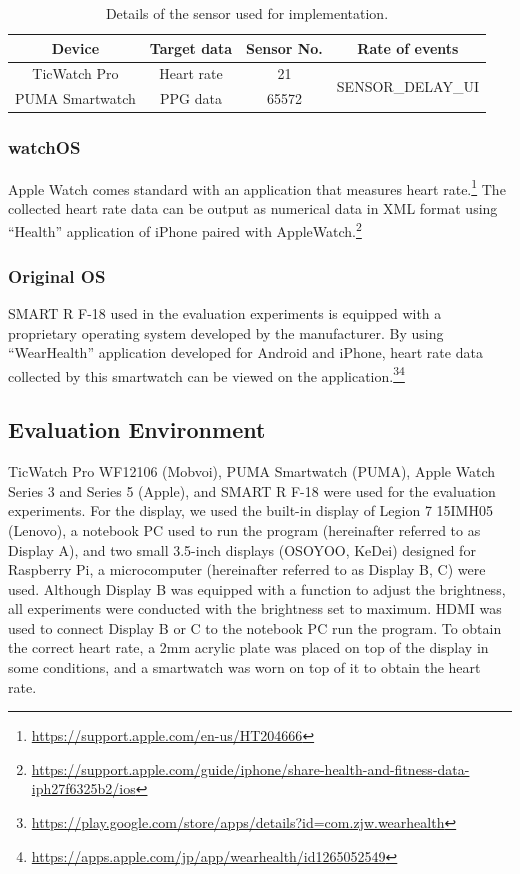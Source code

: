 \documentclass[sigchi,authordraft]{acmart}
\begin{document}
\begin{table}[!t]
  \centering
  \caption{Details of the sensor used for implementation.}
  \begin{tabular}{c|c|c|c} \hline\hline
    Device & Target data & Sensor No. & Rate of events \\ \hline
    TicWatch Pro & Heart rate & 21 & \multirow{2}{*}{SENSOR\_DELAY\_UI} \\
    PUMA Smartwatch & PPG data & 65572 & \\ \hline
  \end{tabular}
  \label{tab:sensor_param}
\end{table}


\subsubsection{watchOS}
\label{subsec:applewatch}
Apple Watch comes standard with an application that measures heart rate.\footnote{\url{https://support.apple.com/en-us/HT204666}} The collected heart rate data can be output as numerical data in XML format using ``Health'' application of iPhone paired with AppleWatch.\footnote{\url{https://support.apple.com/guide/iphone/share-health-and-fitness-data-iph27f6325b2/ios}}


\subsubsection{Original OS}
\label{subsec:original}
SMART R F-18 used in the evaluation experiments is equipped with a proprietary operating system developed by the manufacturer. By using ``WearHealth'' application developed for Android and iPhone, heart rate data collected by this smartwatch can be viewed on the application.\footnote{\url{https://play.google.com/store/apps/details?id=com.zjw.wearhealth}}\footnote{\url{https://apps.apple.com/jp/app/wearhealth/id1265052549}}



\subsection{Evaluation Environment}
TicWatch Pro WF12106 (Mobvoi), PUMA Smartwatch (PUMA), Apple Watch Series 3 and Series 5 (Apple), and SMART R F-18 were used for the evaluation experiments. For the display, we used the built-in display of Legion 7 15IMH05 (Lenovo), a notebook PC used to run the program (hereinafter referred to as Display A), and two small 3.5-inch displays (OSOYOO, KeDei) designed for Raspberry Pi, a microcomputer (hereinafter referred to as Display B, C) were used. Although Display B was equipped with a function to adjust the brightness, all experiments were conducted with the brightness set to maximum. HDMI was used to connect Display B or C to the notebook PC run the program. To obtain the correct heart rate, a 2mm acrylic plate was placed on top of the display in some conditions, and a smartwatch was worn on top of it to obtain the heart rate.
\end{document}
